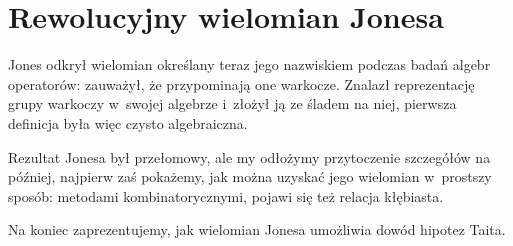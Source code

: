 
\section{Rewolucyjny wielomian Jonesa}
%

Jones odkrył wielomian określany teraz jego nazwiskiem podczas badań algebr operatorów: zauważył, że przypominają one warkocze.
Znalazł reprezentację grupy warkoczy w~swojej algebrze i~złożył ją ze śladem na niej, pierwsza definicja była więc czysto algebraiczna.

Rezultat Jonesa był przełomowy, ale my odłożymy przytoczenie szczegółów na później, najpierw zaś pokażemy, jak można uzyskać jego wielomian w~prostszy sposób: metodami kombinatorycznymi, pojawi się też relacja kłębiasta.

Na koniec zaprezentujemy, jak wielomian Jonesa umożliwia dowód hipotez Taita.













%




